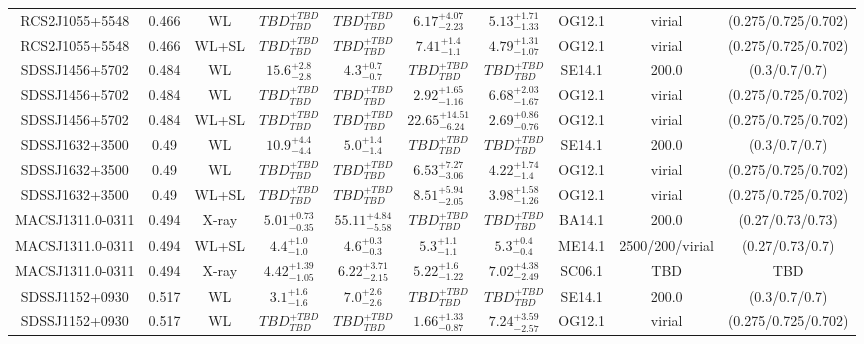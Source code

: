 \begin{table}
\begin{tabular}{cccccccccc}
RCS2J1055+5548 & 0.466 & WL & ${TBD}^{+TBD}_{TBD}$ & ${TBD}^{+TBD}_{TBD}$ & ${6.17}^{+4.07}_{-2.23}$ & ${5.13}^{+1.71}_{-1.33}$ & OG12.1 & virial & (0.275/0.725/0.702) \\
RCS2J1055+5548 & 0.466 & WL+SL & ${TBD}^{+TBD}_{TBD}$ & ${TBD}^{+TBD}_{TBD}$ & ${7.41}^{+1.4}_{-1.1}$ & ${4.79}^{+1.31}_{-1.07}$ & OG12.1 & virial & (0.275/0.725/0.702) \\
SDSSJ1456+5702 & 0.484 & WL & ${15.6}^{+2.8}_{-2.8}$ & ${4.3}^{+0.7}_{-0.7}$ & ${TBD}^{+TBD}_{TBD}$ & ${TBD}^{+TBD}_{TBD}$ & SE14.1 & 200.0 & (0.3/0.7/0.7) \\
SDSSJ1456+5702 & 0.484 & WL & ${TBD}^{+TBD}_{TBD}$ & ${TBD}^{+TBD}_{TBD}$ & ${2.92}^{+1.65}_{-1.16}$ & ${6.68}^{+2.03}_{-1.67}$ & OG12.1 & virial & (0.275/0.725/0.702) \\
SDSSJ1456+5702 & 0.484 & WL+SL & ${TBD}^{+TBD}_{TBD}$ & ${TBD}^{+TBD}_{TBD}$ & ${22.65}^{+14.51}_{-6.24}$ & ${2.69}^{+0.86}_{-0.76}$ & OG12.1 & virial & (0.275/0.725/0.702) \\
SDSSJ1632+3500 & 0.49 & WL & ${10.9}^{+4.4}_{-4.4}$ & ${5.0}^{+1.4}_{-1.4}$ & ${TBD}^{+TBD}_{TBD}$ & ${TBD}^{+TBD}_{TBD}$ & SE14.1 & 200.0 & (0.3/0.7/0.7) \\
SDSSJ1632+3500 & 0.49 & WL & ${TBD}^{+TBD}_{TBD}$ & ${TBD}^{+TBD}_{TBD}$ & ${6.53}^{+7.27}_{-3.06}$ & ${4.22}^{+1.74}_{-1.4}$ & OG12.1 & virial & (0.275/0.725/0.702) \\
SDSSJ1632+3500 & 0.49 & WL+SL & ${TBD}^{+TBD}_{TBD}$ & ${TBD}^{+TBD}_{TBD}$ & ${8.51}^{+5.94}_{-2.05}$ & ${3.98}^{+1.58}_{-1.26}$ & OG12.1 & virial & (0.275/0.725/0.702) \\
MACSJ1311.0-0311 & 0.494 & X-ray & ${5.01}^{+0.73}_{-0.35}$ & ${55.11}^{+4.84}_{-5.58}$ & ${TBD}^{+TBD}_{TBD}$ & ${TBD}^{+TBD}_{TBD}$ & BA14.1 & 200.0 & (0.27/0.73/0.73) \\
MACSJ1311.0-0311 & 0.494 & WL+SL & ${4.4}^{+1.0}_{-1.0}$ & ${4.6}^{+0.3}_{-0.3}$ & ${5.3}^{+1.1}_{-1.1}$ & ${5.3}^{+0.4}_{-0.4}$ & ME14.1 & 2500/200/virial & (0.27/0.73/0.7) \\
MACSJ1311.0-0311 & 0.494 & X-ray & ${4.42}^{+1.39}_{-1.05}$ & ${6.22}^{+3.71}_{-2.15}$ & ${5.22}^{+1.6}_{-1.22}$ & ${7.02}^{+4.38}_{-2.49}$ & SC06.1 & TBD & TBD \\
SDSSJ1152+0930 & 0.517 & WL & ${3.1}^{+1.6}_{-1.6}$ & ${7.0}^{+2.6}_{-2.6}$ & ${TBD}^{+TBD}_{TBD}$ & ${TBD}^{+TBD}_{TBD}$ & SE14.1 & 200.0 & (0.3/0.7/0.7) \\
SDSSJ1152+0930 & 0.517 & WL & ${TBD}^{+TBD}_{TBD}$ & ${TBD}^{+TBD}_{TBD}$ & ${1.66}^{+1.33}_{-0.87}$ & ${7.24}^{+3.59}_{-2.57}$ & OG12.1 & virial & (0.275/0.725/0.702) \\

\end{tabular}
\end{table}
